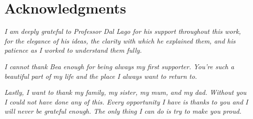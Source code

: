 \chapter*{Acknowledgments}
\thispagestyle{empty}

\textit{I am deeply grateful to Professor Dal Lago for his support throughout this work, for the elegance of his ideas, the clarity with which he explained them, and his patience as I worked to understand them fully.}

\textit{I cannot thank Bea enough for being always my first supporter. You're such a beautiful part of my life and the place I always want to return to.}

\textit{Lastly, I want to thank my family, my sister, my mum, and my dad. Without you I could not have done any of this. Every opportunity I have is thanks to you and I will never be grateful enough. The only thing I can do is try to make you proud.}